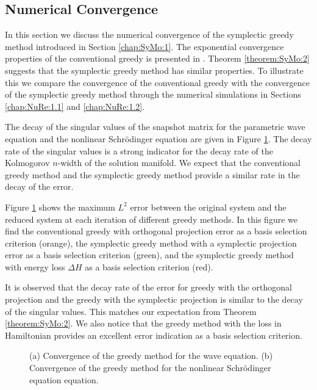 \documentclass[final]{siamart}
\begin{document}
\subsection{Numerical Convergence} {{\color{black}} In this section we discuss the numerical convergence of the symplectic greedy method introduced in Section \ref{chap:SyMo:1}. The exponential convergence properties of the conventional greedy \cite{Quarteroni:2016wi} is presented in \cite{Buffa:2012iz,Binev:2011fj}. Theorem \ref{theorem:SyMo:2} suggests that the symplectic greedy method has similar properties. To illustrate this we compare the convergence of the conventional greedy with the convergence of the symplectic greedy method through the numerical simulations in Sections \ref{chap:NuRe:1.1} and \ref{chap:NuRe:1.2}. 

The decay of the singular values of the snapshot matrix for the parametric wave equation and the nonlinear Schr\"odinger equation are given in Figure \ref{fig:NuRe:5}. The decay rate of the singular values is a strong indicator for the decay rate of the Kolmogorov $n$-width of the solution manifold. We expect that the conventional greedy method and the symplectic greedy method provide a similar rate in the decay of the error.
	
Figure \ref{fig:NuRe:5} shows the maximum $L^2$ error between the original system and the reduced system at each iteration of different greedy methods. In this figure we find the conventional greedy with orthogonal projection error as a basis selection criterion (orange), the symplectic greedy method with a symplectic projection error as a basis selection criterion (green), and the symplectic greedy method with energy loss $\Delta H$ as a basis selection criterion (red).

It is observed that the decay rate of the error for greedy with the orthogonal projection and the greedy with the symplectic projection is similar to the decay of the singular values. This matches our expectation from Theorem \ref{theorem:SyMo:2}. We also notice that the greedy method with the loss in Hamiltonian provides an excellent error indication as a basis selection criterion.
}

\begin{figure}

\begin{minipage}{.5\linewidth}
\centering
{}
\end{minipage}\begin{minipage}{.5\linewidth}
\centering
{}
\end{minipage}\par\medskip
\centering

\caption{ (a) Convergence of the greedy method for the wave equation. (b) Convergence of the greedy method for the nonlinear Schr\"odinger equation equation. }
\label{fig:NuRe:5}
\end{figure}
\end{document}
